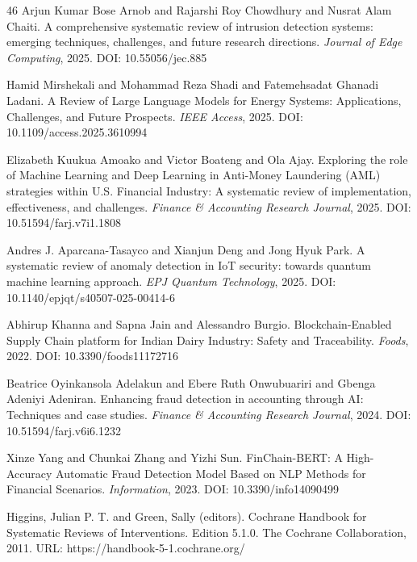\documentclass[3p,times,procedia]{elsarticle}
\begin{document}
\begin{thebibliography}{46}
Arjun Kumar Bose Arnob and Rajarshi Roy Chowdhury and Nusrat Alam Chaiti.
A comprehensive systematic review of intrusion detection systems: emerging techniques, challenges, and future research directions.
\textit{Journal of Edge Computing}, 2025.
DOI: 10.55056/jec.885

Hamid Mirshekali and Mohammad Reza Shadi and Fatemehsadat Ghanadi Ladani.
A Review of Large Language Models for Energy Systems: Applications, Challenges, and Future Prospects.
\textit{IEEE Access}, 2025.
DOI: 10.1109/access.2025.3610994

Elizabeth Kuukua Amoako and Victor Boateng and Ola Ajay.
Exploring the role of Machine Learning and Deep Learning in Anti-Money Laundering (AML) strategies within U.S. Financial Industry: A systematic review of implementation, effectiveness, and challenges.
\textit{Finance \& Accounting Research Journal}, 2025.
DOI: 10.51594/farj.v7i1.1808

Andres J. Aparcana-Tasayco and Xianjun Deng and Jong Hyuk Park.
A systematic review of anomaly detection in IoT security: towards quantum machine learning approach.
\textit{EPJ Quantum Technology}, 2025.
DOI: 10.1140/epjqt/s40507-025-00414-6

Abhirup Khanna and Sapna Jain and Alessandro Burgio.
Blockchain-Enabled Supply Chain platform for Indian Dairy Industry: Safety and Traceability.
\textit{Foods}, 2022.
DOI: 10.3390/foods11172716

Beatrice Oyinkansola Adelakun and Ebere Ruth Onwubuariri and Gbenga Adeniyi Adeniran.
Enhancing fraud detection in accounting through AI: Techniques and case studies.
\textit{Finance \& Accounting Research Journal}, 2024.
DOI: 10.51594/farj.v6i6.1232

Xinze Yang and Chunkai Zhang and Yizhi Sun.
FinChain-BERT: A High-Accuracy Automatic Fraud Detection Model Based on NLP Methods for Financial Scenarios.
\textit{Information}, 2023.
DOI: 10.3390/info14090499

Higgins, Julian P. T. and Green, Sally (editors).
Cochrane Handbook for Systematic Reviews of Interventions.
Edition 5.1.0.
The Cochrane Collaboration, 2011.
URL: https://handbook-5-1.cochrane.org/

\end{thebibliography}
\end{document}
